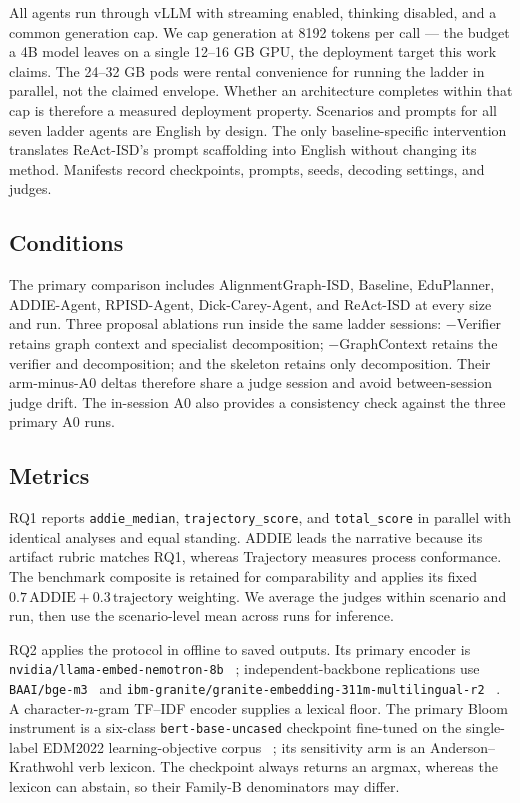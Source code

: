 All agents run through vLLM with streaming enabled, thinking disabled, and a common
generation cap. We cap generation at 8192 tokens per call --- the budget a 4B model leaves on a single 12--16 GB GPU, the deployment target this work claims. The 24--32 GB pods were rental convenience for running the ladder in parallel, not the claimed envelope.
Whether an architecture completes within that cap is therefore a measured deployment
property. Scenarios and prompts for all seven ladder agents are English by design.
The only baseline-specific intervention translates ReAct-ISD's prompt scaffolding
into English without changing its method. Manifests record checkpoints, prompts,
seeds, decoding settings, and judges.

\subsection{Conditions}
\label{sec:conditions}

The primary comparison includes AlignmentGraph-ISD, Baseline, EduPlanner,
ADDIE-Agent, RPISD-Agent, Dick-Carey-Agent, and ReAct-ISD at every size and run.
Three proposal ablations run inside the same ladder sessions: $-$Verifier retains
graph context and specialist decomposition; $-$GraphContext retains the verifier
and decomposition; and the skeleton retains only decomposition. Their arm-minus-A0
deltas therefore share a judge session and avoid between-session judge drift. The
in-session A0 also provides a consistency check against the three primary A0 runs.

\subsection{Metrics}
\label{sec:metrics}

RQ1 reports \texttt{addie\_median}, \texttt{trajectory\_score}, and
\texttt{total\_score} in parallel with identical analyses and equal standing.
ADDIE leads the narrative because its artifact rubric matches RQ1, whereas
Trajectory measures process conformance. The benchmark composite is retained for
comparability and applies its fixed $0.7\,\text{ADDIE}+0.3\,\text{trajectory}$
weighting. We average the judges within scenario and run, then use the
scenario-level mean across runs for inference.

RQ2 applies the protocol in  offline to saved outputs. Its
primary encoder is \texttt{nvidia/llama-embed-nemotron-8b}
~\cite{babakhin2025nemotron}; independent-backbone replications use
\texttt{BAAI/bge-m3}~\cite{chen2024m3embedding} and
\texttt{ibm-granite/granite-embedding-311m-multilingual-r2}
~\cite{awasthy2026granite}. A character-$n$-gram TF--IDF encoder supplies a lexical
floor. The primary Bloom instrument is a six-class \texttt{bert-base-uncased}
checkpoint fine-tuned on the single-label EDM2022 learning-objective corpus
~\cite{anderson2001taxonomy,li2022bloomclassification}; its sensitivity arm is an
Anderson--Krathwohl verb lexicon. The checkpoint always returns an argmax, whereas
the lexicon can abstain, so their Family-B denominators may differ.


